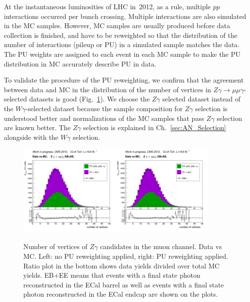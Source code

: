 At the instantaneous luminosities of LHC in~2012, as a rule, multiple $pp$ interactions occurred per bunch crossing. Multiple interactions are also simulated in the MC samples. However, MC samples are usually produced before data collection is finished, and have to be reweighted so that the distribution of the number of interactions (pileup or PU) in a simulated sample matches the data. The PU weights are assigned to each event in each MC sample to make the PU distribution in MC accurately describe PU in data.



To validate the procedure of the PU reweighting, we confirm that the agreement between data and MC in the distribution of the number of vertices in $Z\gamma\rightarrow\mu\mu\gamma$-selected datasets is good (Fig.~\ref{fig:DATAvsMC_nVtx}). We choose the $Z\gamma$ selected dataset instead of the $W\gamma$-selected dataset because the sample composition for $Z\gamma$ selection is understood better and normalizations of the MC samples that pass $Z\gamma$ selection are known better. The $Z\gamma$ selection is explained in Ch.~\ref{sec:AN_Selection} alongside with the $W\gamma$ selection.

\begin{figure}[htb]
  \begin{center}
   \includegraphics[width=0.45\textwidth]{../figs/figs_v11/MUON_ZGamma/PrepareYields/c_TotalDATAvsMC_EtaCommon__nVtx_noPU.png}\includegraphics[width=0.45\textwidth]{../figs/figs_v11/MUON_ZGamma/PrepareYields/c_TotalDATAvsMC_EtaCommon__nVtx.png}
  \caption{Number of vertices of $Z\gamma$ candidates in the muon channel. Data vs MC. Left: no PU reweighting applied, right: PU reweighting applied. Ratio plot in the bottom shows data yields divided over total MC yields. EB+EE means that events with a final state photon reconstructed in the ECal barrel as well as  events with a final state photon reconstructed in the ECal endcap are shown on the plots.}
  \label{fig:DATAvsMC_nVtx}
  \end{center}
\end{figure}
